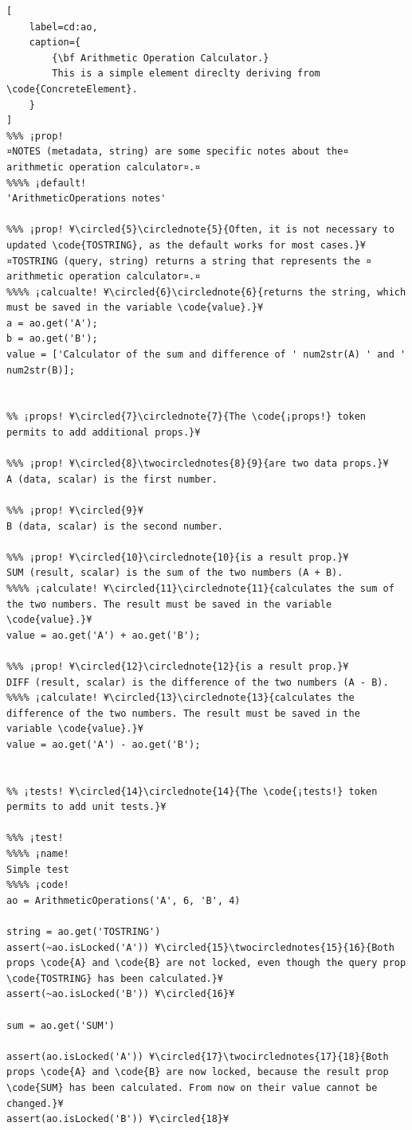 \documentclass{tufte-handout}
\begin{document}
\begin{lstlisting}[
	label=cd:ao,
	caption={
		{\bf Arithmetic Operation Calculator.}
		This is a simple element direclty deriving from \code{ConcreteElement}.
	}
]
%%% ¡prop!
¤NOTES (metadata, string) are some specific notes about the¤ arithmetic operation calculator¤.¤
%%%% ¡default!
'ArithmeticOperations notes'

%%% ¡prop! ¥\circled{5}\circlednote{5}{Often, it is not necessary to updated \code{TOSTRING}, as the default works for most cases.}¥
¤TOSTRING (query, string) returns a string that represents the ¤ arithmetic operation calculator¤.¤
%%%% ¡calcualte! ¥\circled{6}\circlednote{6}{returns the string, which must be saved in the variable \code{value}.}¥
a = ao.get('A');
b = ao.get('B');
value = ['Calculator of the sum and difference of ' num2str(A) ' and ' num2str(B)];


%% ¡props! ¥\circled{7}\circlednote{7}{The \code{¡props!} token permits to add additional props.}¥

%%% ¡prop! ¥\circled{8}\twocirclednotes{8}{9}{are two data props.}¥
A (data, scalar) is the first number.

%%% ¡prop! ¥\circled{9}¥
B (data, scalar) is the second number.

%%% ¡prop! ¥\circled{10}\circlednote{10}{is a result prop.}¥
SUM (result, scalar) is the sum of the two numbers (A + B).
%%%% ¡calculate! ¥\circled{11}\circlednote{11}{calculates the sum of the two numbers. The result must be saved in the variable \code{value}.}¥
value = ao.get('A') + ao.get('B');

%%% ¡prop! ¥\circled{12}\circlednote{12}{is a result prop.}¥
DIFF (result, scalar) is the difference of the two numbers (A - B).
%%%% ¡calculate! ¥\circled{13}\circlednote{13}{calculates the difference of the two numbers. The result must be saved in the variable \code{value}.}¥
value = ao.get('A') - ao.get('B');


%% ¡tests! ¥\circled{14}\circlednote{14}{The \code{¡tests!} token permits to add unit tests.}¥

%%% ¡test!
%%%% ¡name!
Simple test
%%%% ¡code!
ao = ArithmeticOperations('A', 6, 'B', 4)

string = ao.get('TOSTRING')
assert(~ao.isLocked('A')) ¥\circled{15}\twocirclednotes{15}{16}{Both props \code{A} and \code{B} are not locked, even though the query prop \code{TOSTRING} has been calculated.}¥
assert(~ao.isLocked('B')) ¥\circled{16}¥

sum = ao.get('SUM')

assert(ao.isLocked('A')) ¥\circled{17}\twocirclednotes{17}{18}{Both props \code{A} and \code{B} are now locked, because the result prop \code{SUM} has been calculated. From now on their value cannot be changed.}¥
assert(ao.isLocked('B')) ¥\circled{18}¥


\end{lstlisting}
\end{document}
